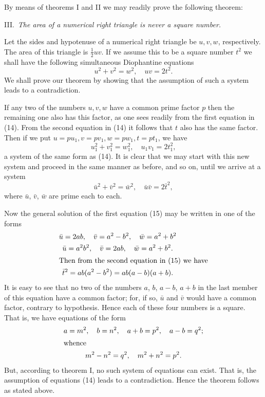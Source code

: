 \documentclass[oneside]{book}
\begin{document}
By means of theorems I and II we may readily prove the following
theorem:

\smallskip III.~\emph{The area of a numerical right triangle is
never a square number.}

Let the sides and hypotenuse of a numerical right triangle be $u, v,
w$, respectively. The area of this triangle is $\frac{1}{2} uv$. If
we assume this to be a square number $t^2$ we shall have the
following simultaneous Diophantine equations
\begin{equation}
u^2 + v^2 = w^2,\quad uv = 2t^2. \tag{14}
\end{equation}
We shall prove our theorem by showing that the assumption of such a
system leads to a contradiction.

If any two of the numbers $u, v, w$ have a common prime factor $p$
then the remaining one also has this factor, as one sees readily
from the first equation in (14). From the second equation in (14) it
follows that $t$ also has the same factor. Then if we put $u = pu_1,
v = pv_1, w = pw_1, t = pt_1$, we have
\begin{equation*}
u_1^2 + v_1^2 = w_1^2,\quad u_1 v_1 = 2t_1^2,
\end{equation*}
a system of the same form as (14). It is clear that we may start
with this new system and proceed in the same manner as before, and
so on, until we arrive at a system
\begin{equation}
\bar{u}^2 + \bar{v}^2 = \bar{w}^2,\quad
  \bar{u}\bar{v} = 2\bar{t}^2, \tag{15}
\end{equation}
where $\bar{u}$, $\bar{v}$, $\bar{w}$ are prime each to each.

Now the general solution of the first equation (15) may be written
in one of the forms
\begin{gather*}
\bar{u} = 2ab,\quad \bar{v} = a^2 - b^2,\quad \bar{w} = a^2 + b^2 \\
\bar{u} = a^2 b^2,\quad \bar{v} = 2ab, \quad \bar{w} = a^2 + b^2. \\
\intertext{Then from the second equation in (15) we have}
\bar{t}^2 = ab(a^2 - b^2 ) = ab(a-b)(a+b).
\end{gather*}
It is easy to see that no two of the numbers $a$, $b$, $a - b$, $a +
b$ in the last member of this equation have a common factor; for, if
so, $\bar{u}$ and $\bar{v}$ would have a common factor, contrary to
hypothesis. Hence each of these four numbers is a square. That is,
we have equations of the form
\begin{gather*}
a = m^2,\quad b = n^2,\quad a + b = p^2,\quad a - b = q^2; \\
\intertext{whence}
m^2 - n^2 = q^2,\quad m^2 + n^2 = p^2.
\end{gather*}
But, according to theorem I, no such system of equations can exist.
That is, the assumption of equations (14) leads to a contradiction.
Hence the theorem follows as stated above.%
\end{document}
